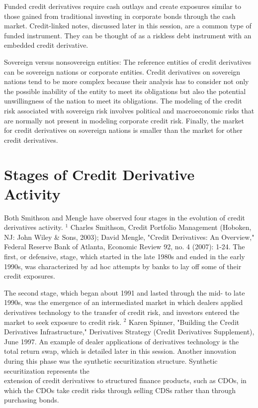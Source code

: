 \documentclass[11pt]{article}
\begin{document}
Funded credit derivatives require cash outlays and create exposures similar to those gained from traditional investing in corporate bonds through the cash market. Credit-linked notes, discussed later in this session, are a common type of funded instrument. They can be thought of as a riskless debt instrument with an embedded credit derivative.

Sovereign versus nonsovereign entities: The reference entities of credit derivatives can be sovereign nations or corporate entities. Credit derivatives on sovereign nations tend to be more complex because their analysis has to consider not only the possible inability of the entity to meet its obligations but also the potential unwillingness of the nation to meet its obligations. The modeling of the credit risk associated with sovereign risk involves political and macroeconomic risks that are normally not present in modeling corporate credit risk. Finally, the market for credit derivatives on sovereign nations is smaller than the market for other credit derivatives.

\section*{Stages of Credit Derivative Activity}
Both Smithson and Mengle have observed four stages in the evolution of credit derivatives activity. ${ }^{1}$ Charles Smithson, Credit Portfolio Management (Hoboken, NJ: John Wiley \& Sons, 2003); David Mengle, "Credit Derivatives: An Overview," Federal Reserve Bank of Atlanta, Economic Review 92, no. 4 (2007): 1-24. The first, or defensive, stage, which started in the late 1980s and ended in the early 1990s, was characterized by ad hoc attempts by banks to lay off some of their credit exposures.

The second stage, which began about 1991 and lasted through the mid- to late 1990s, was the emergence of an intermediated market in which dealers applied derivatives technology to the transfer of credit risk, and investors entered the market to seek exposure to credit risk. ${ }^{2}$ Karen Spinner, "Building the Credit Derivatives Infrastructure," Derivatives Strategy (Credit Derivatives Supplement), June 1997. An example of dealer applications of derivatives technology is the total return swap, which is detailed later in this session. Another innovation during this phase was the synthetic securitization structure. Synthetic securitization represents the\\
extension of credit derivatives to structured finance products, such as CDOs, in which the CDOs take credit risks through selling CDSs rather than through purchasing bonds.
\end{document}
